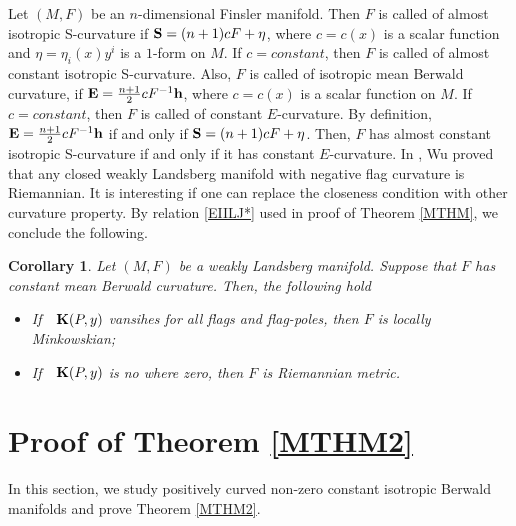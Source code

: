 \documentclass[12pt,a4paper]{article}
\newtheorem{cor}{Corollary}[section]
\theoremstyle{definition}
\numberwithin{equation}{section}
\begin{document}
\bigskip
Let $(M, F)$ be an $n$-dimensional  Finsler manifold.  Then  $F$ is called of almost isotropic S-curvature if ${\bf S}= (n+1) c F+\eta$, where $c= c(x)$ is a scalar function and  $\eta=\eta_i(x)y^i$ is a $1$-form on $M$. If $c=constant$, then $F$ is called of almost constant isotropic S-curvature.  Also, $F$ is called of isotropic mean Berwald curvature, if ${\bf E}=\frac{n+1}{2}cF^{-1}{\bf h}$, where $c= c(x)$ is a scalar function  on $M$. If $c=constant$, then $F$ is called of constant $E$-curvature. By definition, ${\bf E}=\frac{n+1}{2}cF^{-1}{\bf h}$ if and only if  ${\bf S}=(n+1)cF+\eta$. Then, $F$ has almost constant isotropic S-curvature if and only if it has constant $E$-curvature. In \cite{Wu},  Wu proved that any closed weakly Landsberg manifold with negative flag curvature is Riemannian.  It is interesting if one can replace the closeness condition with other curvature property.  By  relation \eqref{EIILJ*} used in proof of  Theorem \ref{MTHM}, we conclude the following.
\begin{cor}\label{cor-1}
Let $(M, F)$ be a weakly Landsberg  manifold. Suppose that $F$ has constant mean Berwald curvature. Then, the following hold
\begin{itemize}
\item[1.] If\ \ ${\bf K}(P, y)$ vansihes for all flags and flag-poles, then $F$ is locally Minkowskian;
\item[2.] If\ \ ${\bf K}(P, y)$ is no where zero, then $F$ is Riemannian metric.
\end{itemize}
\end{cor}
\section{Proof of Theorem \ref{MTHM2}}
In this section, we study positively curved non-zero constant isotropic Berwald manifolds and prove Theorem \ref{MTHM2}.
\end{document}
